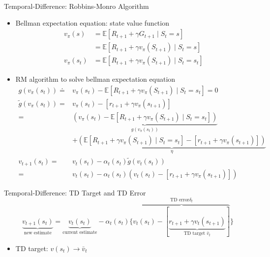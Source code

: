 \documentclass[UTF8, 10pt]{beamer}
\begin{document}
\begin{CJK*}{UTF8}{gbsn}
\begin{frame}{Temporal-Difference: Robbins-Monro Algorithm}
\begin{itemize}
		\item Bellman expectation equation: state value function
			$$
			\begin{aligned}
			v_{\pi}(s)&=\mathbb{E}\left[R_{t+1}+\gamma G_{t+1} \mid S_{t}=s\right]
			\\
			&=\mathbb{E}\left[R_{t+1}+\gamma v_{\pi}\left(S_{t+1}\right) \mid S_{t}=s\right]
			\\
			v_{\pi}(s_t)&=\mathbb{E}\left[R_{t+1}+\gamma v_{\pi}\left(S_{t+1}\right) \mid S_{t}=s_t\right]
			\end{aligned}
			$$
		\item RM algorithm to solve bellman expectation equation
			$$
			\begin{aligned} 
			g\left(v_{\pi}\left(s_{t}\right)\right) \doteq & v_{\pi}\left(s_{t}\right)-\mathbb{E}\left[R_{t+1}+\gamma v_{\pi}\left(S_{t+1}\right) \mid S_{t}=s_{t}\right]=0
			\\
			\tilde{g}\left(v_{\pi}\left(s_{t}\right)\right)= & v_{\pi}\left(s_{t}\right)-\left[r_{t+1}+\gamma v_{\pi}\left(s_{t+1}\right)\right] \\ = & \underbrace{\left(v_{\pi}\left(s_{t}\right)-\mathbb{E}\left[R_{t+1}+\gamma v_{\pi}\left(S_{t+1}\right) \mid S_{t}=s_{t}\right]\right)}_{g\left(v_{\pi}\left(s_{t}\right)\right)} \\ & +\underbrace{\left(\mathbb{E}\left[R_{t+1}+\gamma v_{\pi}\left(S_{t+1}\right) \mid S_{t}=s_{t}\right]-\left[r_{t+1}+\gamma v_{\pi}\left(s_{t+1}\right)\right]\right)}_{\eta}
			\\
			v_{t+1}\left(s_{t}\right)  =&v_{t}\left(s_{t}\right)-\alpha_{t}\left(s_{t}\right) \tilde{g}\left(v_{t}\left(s_{t}\right)\right) \\ =&v_{t}\left(s_{t}\right)-\alpha_{t}\left(s_{t}\right)\left(v_{t}\left(s_{t}\right)-\left[r_{t+1}+\gamma v_{\pi}\left(s_{t+1}\right)\right]\right)
			\end{aligned}
			$$
	\end{itemize}
\end{frame}
\begin{frame}{Temporal-Difference: TD Target and TD Error}
	$$
	\underbrace{v_{t+1}\left(s_{t}\right)}_{\text {new estimate}}=\underbrace{v_{t}\left(s_{t}\right)}_{\text {current estimate}}-\alpha_{t}\left(s_{t}\right)
	\Big\{\overbrace{v_{t}\left(s_{t}\right)-[\underbrace{r_{t+1}+\gamma v_{t}\left(s_{t+1}\right)}_{\text {TD target } \bar{v}_{t}}]
	}
	^{\text {TD error} \delta_{t}}
	\Big\}
	$$
	\begin{itemize}
		\item TD target: $v\left(s_{t}\right) \rightarrow \bar{v}_{t}$

\end{itemize}
\end{frame}
\end{CJK*}
\end{document}
